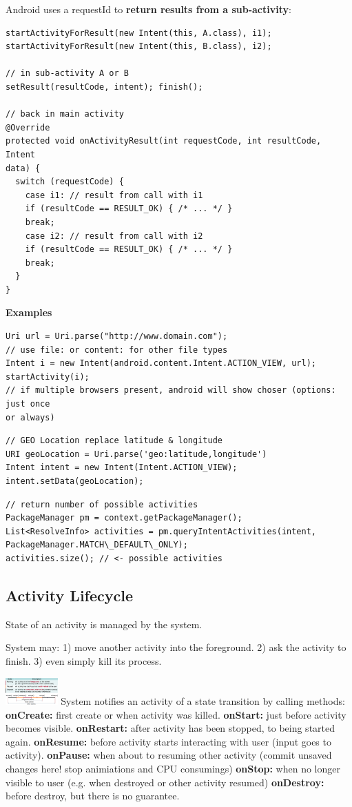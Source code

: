 Android uses a requestId to \textbf{return results from a sub-activity}:
\begin{lstlisting}
startActivityForResult(new Intent(this, A.class), i1);
startActivityForResult(new Intent(this, B.class), i2);

// in sub-activity A or B
setResult(resultCode, intent); finish();

// back in main activity
@Override
protected void onActivityResult(int requestCode, int resultCode, Intent
data) {
  switch (requestCode) {
    case i1: // result from call with i1
    if (resultCode == RESULT_OK) { /* ... */ }
    break;
    case i2: // result from call with i2
    if (resultCode == RESULT_OK) { /* ... */ }
    break;
  }
}
\end{lstlisting}

\textbf{Examples}
\begin{lstlisting}
Uri url = Uri.parse("http://www.domain.com");
// use file: or content: for other file types
Intent i = new Intent(android.content.Intent.ACTION_VIEW, url);
startActivity(i);
// if multiple browsers present, android will show choser (options: just once
or always)
\end{lstlisting}

\begin{lstlisting}
// GEO Location replace latitude & longitude
URI geoLocation = Uri.parse('geo:latitude,longitude')
Intent intent = new Intent(Intent.ACTION_VIEW);
intent.setData(geoLocation);
\end{lstlisting}

\begin{lstlisting}
// return number of possible activities
PackageManager pm = context.getPackageManager();
List<ResolveInfo> activities = pm.queryIntentActivities(intent, PackageManager.MATCH\_DEFAULT\_ONLY);
activities.size(); // <- possible activities
\end{lstlisting}

\subsection{Activity Lifecycle}
State of an activity is managed by the system.

System may:
1) move another activity into the foreground.
2) ask the activity to finish.
3) even simply kill its process.

\includegraphics[width=0.15\textwidth]{android/activity_states.png}
System notifies an activity of a state transition by calling methods:
\textbf{onCreate:} first create or when activity was killed.
\textbf{onStart:} just before activity becomes visible.
\textbf{onRestart:} after activity has been stopped, to being started again.
\textbf{onResume:} before activity starts interacting with user (input goes to activity).
\textbf{onPause:} when about to resuming other activity (commit unsaved changes
here! stop animiations and CPU consumings)
\textbf{onStop:} when no longer visible to user (e.g. when destroyed or other activity resumed)
\textbf{onDestroy:} before destroy, but there is no guarantee.



